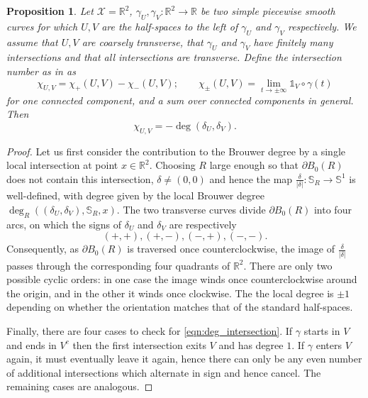 \documentclass[12pt]{amsart}
\newtheorem{proposition}[theorem]{Proposition}
\newcommand{\RM}{{\mathbb R}}
\newcommand{\SM}{{\mathbb S}}
\newcommand{\Xx}{{\mathcal X}}
\newcommand{\pdv}{\partial}
\begin{document}
\begin{proposition}\label{prop:intersection}
Let $\Xx=\RM^2$, $\gamma_U,\gamma_V:\RM^2 \to \RM$ be two simple piecewise smooth curves for which $U,V$ are the half-spaces to the left of $\gamma_U$ and $\gamma_V$ respectively. We assume that $U,V$ are coarsely transverse, that $\gamma_U$ and $\gamma_V$ have finitely many intersections and that all intersections are transverse. Define the intersection number as in \cite{drouot2024bulk} as
\[\chi_{U,V} = \chi_{+}(U,V) - \chi_{-}(U,V); \qquad \chi_{\pm}(U,V) = \lim_{t \to \pm \infty} \mathds{1}_V \circ \gamma(t)\]
for one connected component, and a sum over connected components in general.
Then 
\begin{equation}\label{eqn:deg_intersection}
    \chi_{U,V} = -\deg(\delta_U, \delta_V).
\end{equation}

\end{proposition}

\begin{proof}
Let us first consider the contribution to the Brouwer degree by a single local intersection at point $x \in \RM^2$.
Choosing $R$ large enough so that $\pdv B_0(R)$ does not contain this intersection, $\delta \neq (0,0)$ and hence the map $\frac{\delta}{|\delta|}: \SM_R \to \SM^1$ is well-defined, with degree given by the local Brouwer degree $\deg_{R}((\delta_U,\delta_V), \SM_R, x)$.
The two transverse curves divide $\pdv B_0(R)$ into four arcs, on which the signs of $\delta_U$ and $\delta_V$ are respectively
\[(+,+),(+,-),(-,+),(-,-).\]
Consequently, as $\pdv B_0(R)$ is traversed once counterclockwise, the image of $\frac{\delta}{|\delta|}$ passes through the corresponding four quadrants of $\RM^2$. 
There are only two possible cyclic orders:
in one case the image winds once counterclockwise around the origin, and in the other it winds once clockwise. The the local degree is $\pm 1$ depending on whether the orientation matches that of the standard half-spaces.

Finally, there are four cases to check for \eqref{eqn:deg_intersection}. If $\gamma$ starts in $V$ and ends in $V^c$ then the first intersection exits $V$ and has degree $1$. If $\gamma$ enters $V$ again, it must eventually leave it again, hence there can only be any even number of additional intersections which alternate in sign and hence cancel. The remaining cases are analogous.
\end{proof}
\end{document}
